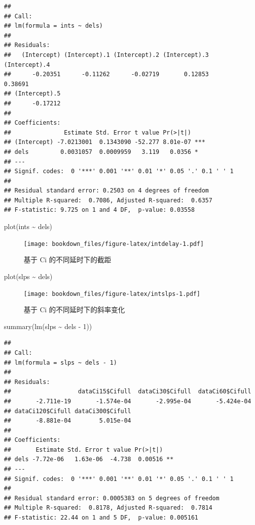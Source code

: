 \documentclass[
]{krantz}
\makeatletter
\newenvironment{Shaded}{\begin{snugshade}}{\end{snugshade}}
\newcommand{\DecValTok}[1]{\textcolor[rgb]{0.00,0.00,0.81}{#1}}
\newcommand{\FunctionTok}[1]{\textcolor[rgb]{0.00,0.00,0.00}{#1}}
\newcommand{\NormalTok}[1]{#1}
\newcommand{\SpecialCharTok}[1]{\textcolor[rgb]{0.00,0.00,0.00}{#1}}
\newenvironment{kframe}{%
\medskip{}
\setlength{\fboxsep}{.8em}
 \def\at@end@of@kframe{}%
 \ifinner\ifhmode%
  \def\at@end@of@kframe{\end{minipage}}%
  \begin{minipage}{\columnwidth}%
 \fi\fi%
 \def\FrameCommand##1{\hskip\@totalleftmargin \hskip-\fboxsep
 \colorbox{shadecolor}{##1}\hskip-\fboxsep
     \hskip-\linewidth \hskip-\@totalleftmargin \hskip\columnwidth}%
 \MakeFramed {\advance\hsize-\width
   \@totalleftmargin\z@ \linewidth\hsize
   \@setminipage}}%
 {\par\unskip\endMakeFramed%
 \at@end@of@kframe}
\renewenvironment{Shaded}{\begin{kframe}}{\end{kframe}}
\makeatother
\begin{document}
\begin{verbatim}
## 
## Call:
## lm(formula = ints ~ dels)
## 
## Residuals:
##   (Intercept) (Intercept).1 (Intercept).2 (Intercept).3 (Intercept).4 
##      -0.20351      -0.11262      -0.02719       0.12853       0.38691 
## (Intercept).5 
##      -0.17212 
## 
## Coefficients:
##               Estimate Std. Error t value Pr(>|t|)    
## (Intercept) -7.0213001  0.1343090 -52.277 8.01e-07 ***
## dels         0.0031057  0.0009959   3.119   0.0356 *  
## ---
## Signif. codes:  0 '***' 0.001 '**' 0.01 '*' 0.05 '.' 0.1 ' ' 1
## 
## Residual standard error: 0.2503 on 4 degrees of freedom
## Multiple R-squared:  0.7086, Adjusted R-squared:  0.6357 
## F-statistic: 9.725 on 1 and 4 DF,  p-value: 0.03558
\end{verbatim}

\begin{Shaded}
\begin{Highlighting}[]
\FunctionTok{plot}\NormalTok{(ints }\SpecialCharTok{\textasciitilde{}}\NormalTok{ dels)}
\end{Highlighting}
\end{Shaded}

\begin{figure}
\centering
\texttt{[image: bookdown\_files/figure-latex/intdelay-1.pdf]}
\caption{\label{fig:intdelay}基于 Ci 的不同延时下的截距}
\end{figure}

\begin{Shaded}
\begin{Highlighting}[]
\FunctionTok{plot}\NormalTok{(slps }\SpecialCharTok{\textasciitilde{}}\NormalTok{ dels)}
\end{Highlighting}
\end{Shaded}

\begin{figure}
\centering
\texttt{[image: bookdown\_files/figure-latex/intslps-1.pdf]}
\caption{\label{fig:intslps}基于 Ci 的不同延时下的斜率变化}
\end{figure}

\begin{Shaded}
\begin{Highlighting}[]
\FunctionTok{summary}\NormalTok{(}\FunctionTok{lm}\NormalTok{(slps }\SpecialCharTok{\textasciitilde{}}\NormalTok{ dels }\SpecialCharTok{{-}} \DecValTok{1}\NormalTok{))}
\end{Highlighting}
\end{Shaded}

\begin{verbatim}
## 
## Call:
## lm(formula = slps ~ dels - 1)
## 
## Residuals:
##                   dataCi15$Cifull  dataCi30$Cifull  dataCi60$Cifull 
##       -2.711e-19       -1.574e-04       -2.995e-04       -5.424e-04 
## dataCi120$Cifull dataCi300$Cifull 
##       -8.881e-04        5.015e-04 
## 
## Coefficients:
##       Estimate Std. Error t value Pr(>|t|)   
## dels -7.72e-06   1.63e-06  -4.738  0.00516 **
## ---
## Signif. codes:  0 '***' 0.001 '**' 0.01 '*' 0.05 '.' 0.1 ' ' 1
## 
## Residual standard error: 0.0005383 on 5 degrees of freedom
## Multiple R-squared:  0.8178, Adjusted R-squared:  0.7814 
## F-statistic: 22.44 on 1 and 5 DF,  p-value: 0.005161
\end{verbatim}
\end{document}
